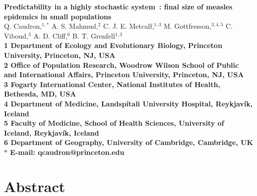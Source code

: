 \documentclass[10pt]{article}
\date{}
\begin{document}
\begin{flushleft}
{\Large
\textbf{Predictability in a highly stochastic system~: final size of measles epidemics in small populations}
}
\\
Q. Caudron,$^{1,\ast}$ 
A. S. Mahmud,$^{2}$
C. J. E. Metcalf,$^{1,3}$
M. Gottfre{\dh}sson,$^{3,4,5}$
C. Viboud,$^{3}$
A. D. Cliff,$^{6}$
B. T. Grenfell$^{1,3}$
\\
\bf{1} Department of Ecology and Evolutionary Biology, Princeton University, Princeton, NJ, USA
\\
\bf{2} Office of Population Research, Woodrow Wilson School of Public and International Affairs, Princeton University, Princeton, NJ, USA
\\
\bf{3} Fogarty International Center, National Institutes of Health, Bethesda, MD, USA
\\
\bf{4} Department of Medicine, Landsp\'{i}tali University Hospital, Reykjav\'{i}k, Iceland
\\
\bf{5} Faculty of Medicine, School of Health Sciences, University of Iceland, Reykjav\'{i}k, Iceland
\\
\bf{6} Department of Geography, University of Cambridge, Cambridge, UK
\\
$\ast$ E-mail: qcaudron@princeton.edu
\end{flushleft}














\section*{Abstract}
\end{document}
